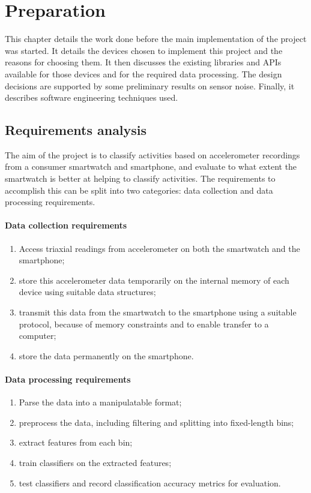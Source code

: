 \chapter{Preparation}
  This chapter details the work done before the main implementation of the project was started. It
  details the devices chosen to implement this project and the reasons for choosing them. It then
  discusses the existing libraries and APIs available for those devices and for the required data
  processing. The design decisions are supported by some preliminary results on sensor noise.  Finally, it describes software engineering techniques used.

  \section{Requirements analysis}
    The aim of the project is to classify activities based on accelerometer recordings from a consumer smartwatch and smartphone, and evaluate to what extent the smartwatch is better at helping to classify activities. The requirements to accomplish this can be split into two categories: data collection and data processing requirements.
    
    \subsubsection{Data collection requirements}
      \begin{enumerate}
        \item Access triaxial readings from accelerometer on both the smartwatch and the smartphone;
        \item store this accelerometer data temporarily on the internal memory of each device using suitable data structures;
        \item transmit this data from the smartwatch to the smartphone using a suitable protocol, because of memory constraints and to enable transfer to a computer;
        \item store the data permanently on the smartphone.
      \end{enumerate}
    
    \subsubsection{Data processing requirements}
      \begin{enumerate}
        \item Parse the data into a manipulatable format;
        \item preprocess the data, including filtering and splitting into fixed-length bins;
        \item extract features from each bin;
        \item train classifiers on the extracted features;
        \item test classifiers and record classification accuracy metrics for evaluation.
      \end{enumerate}
    
